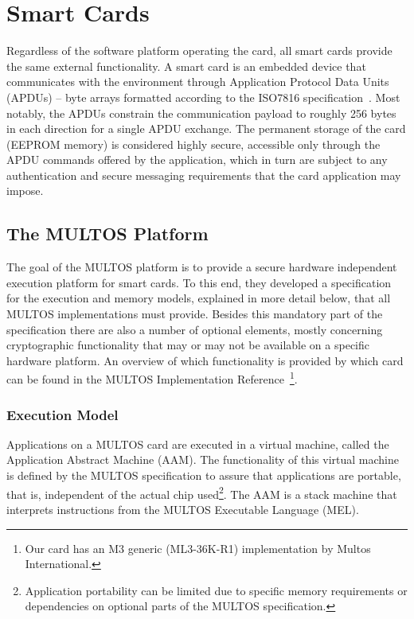 \section{Smart Cards}

Regardless of the software platform operating the card, all smart cards provide
the same external functionality. A smart card is an embedded device that
communicates with the environment through Application Protocol Data Units
(APDUs) -- byte arrays formatted according to the ISO7816
specification~\cite{ISO7816_4}. Most notably, the APDUs constrain the
communication payload to roughly 256 bytes in each direction for a single APDU
exchange. The permanent storage of the card (EEPROM memory) is considered
highly secure, accessible only through the APDU commands offered by the
application, which in turn are subject to any authentication and secure
messaging requirements that the card application may impose.

\subsection{The MULTOS Platform}

The goal of the MULTOS platform is to provide a secure hardware independent
execution platform for smart cards. To this end, they developed a specification
for the execution and memory models, explained in more detail below, that all
MULTOS implementations must provide. Besides this mandatory part of the
specification there are also a number of optional elements, mostly concerning
cryptographic functionality that may or may not be available on a specific
hardware platform. An overview of which functionality is provided by which card
can be found in the MULTOS Implementation Reference~\cite{MIR2012}\footnote{Our
card has an M3 generic (ML3-36K-R1) implementation by Multos International.}.

\subsubsection{Execution Model}

Applications on a MULTOS card are executed in a virtual machine, called the
Application Abstract Machine (AAM). The functionality of this virtual machine
is defined by the MULTOS specification to assure that applications are
portable, that is, independent of the actual chip used\footnote{Application
portability can be limited due to specific memory requirements or dependencies
on optional parts of the MULTOS specification.}. The AAM is a stack machine
that interprets instructions from the MULTOS Executable Language (MEL).

